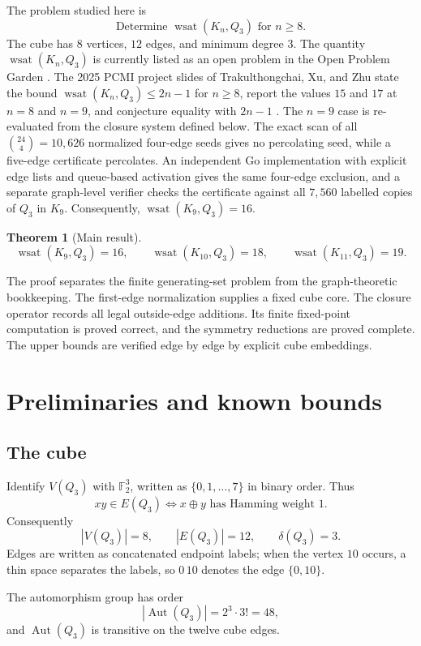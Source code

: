 \documentclass[11pt]{article}
\numberwithin{equation}{section}
\newtheorem{theorem}{Theorem}[section]
\newcommand{\wsat}{\operatorname{wsat}}
\newcommand{\Aut}{\operatorname{Aut}}
\begin{document}
The problem studied here is
\[
\boxed{\text{Determine }\wsat(K_n,Q_3)\text{ for }n\ge 8.}
\]
The cube has $8$ vertices, $12$ edges, and minimum degree $3$. The quantity $\wsat(K_n,Q_3)$ is currently listed as an open problem in the Open Problem Garden \cite{OPG}. The 2025 PCMI project slides of Trakulthongchai, Xu, and Zhu state the bound $\wsat(K_n,Q_3)\le 2n-1$ for $n\ge8$, report the values $15$ and $17$ at $n=8$ and $n=9$, and conjecture equality with $2n-1$ \cite{PCMI2025}. The $n=9$ case is re-evaluated from the closure system defined below. The exact scan of all $\binom{24}{4}=10,626$ normalized four-edge seeds gives no percolating seed, while a five-edge certificate percolates. An independent Go implementation with explicit edge lists and queue-based activation gives the same four-edge exclusion, and a separate graph-level verifier checks the certificate against all $7,560$ labelled copies of $Q_3$ in $K_9$. Consequently, $\wsat(K_9,Q_3)=16$.

\begin{theorem}[Main result]\label{thm:main}
\[
\boxed{\wsat(K_9,Q_3)=16,\qquad \wsat(K_{10},Q_3)=18,\qquad \wsat(K_{11},Q_3)=19.}
\]
\end{theorem}

The proof separates the finite generating-set problem from the graph-theoretic bookkeeping. The first-edge normalization supplies a fixed cube core. The closure operator records all legal outside-edge additions. Its finite fixed-point computation is proved correct, and the symmetry reductions are proved complete. The upper bounds are verified edge by edge by explicit cube embeddings.

\section{Preliminaries and known bounds}\label{sec:prelim}

\subsection{The cube}
Identify $V(Q_3)$ with $\mathbb F_2^3$, written as $\{0,1,\ldots,7\}$ in binary order. Thus
\[
xy\in E(Q_3)\iff x\oplus y\text{ has Hamming weight }1.
\]
Consequently
\[
|V(Q_3)|=8,\qquad |E(Q_3)|=12,\qquad \delta(Q_3)=3.
\]
Edges are written as concatenated endpoint labels; when the vertex $10$ occurs, a thin space separates the labels, so $0\,10$ denotes the edge $\{0,10\}$.

The automorphism group has order
\[
|\Aut(Q_3)|=2^3\cdot 3!=48,
\]
and $\Aut(Q_3)$ is transitive on the twelve cube edges.
\end{document}
